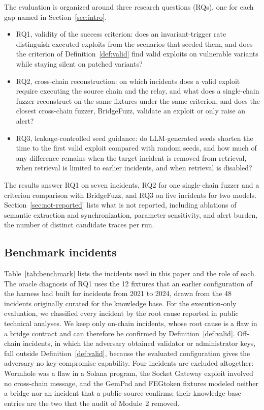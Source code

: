 \documentclass[a4paper]{cas-sc}
\begin{document}
The evaluation is organized around three research questions (RQs), one for each gap named in Section~\ref{sec:intro}.
\begin{itemize}
    \item RQ1, validity of the success criterion: does an invariant-trigger rate distinguish executed exploits from the scenarios that seeded them, and does the criterion of Definition~\ref{def:valid} find valid exploits on vulnerable variants while staying silent on patched variants?
    \item RQ2, cross-chain reconstruction: on which incidents does a valid exploit require executing the source chain and the relay, and what does a single-chain fuzzer reconstruct on the same fixtures under the same criterion, and does the closest cross-chain fuzzer, BridgeFuzz, validate an exploit or only raise an alert?
    \item RQ3, leakage-controlled seed guidance: do LLM-generated seeds shorten the time to the first valid exploit compared with random seeds, and how much of any difference remains when the target incident is removed from retrieval, when retrieval is limited to earlier incidents, and when retrieval is disabled?
\end{itemize}
The results answer RQ1 on seven incidents, RQ2 for one single-chain fuzzer and a criterion comparison with BridgeFuzz, and RQ3 on five incidents for two models. Section~\ref{sec:not-reported} lists what is not reported, including ablations of semantic extraction and synchronization, parameter sensitivity, and alert burden, the number of distinct candidate traces per run.

\subsection{Benchmark incidents}

Table~\ref{tab:benchmark} lists the incidents used in this paper and the role of each. The oracle diagnosis of RQ1 uses the 12 fixtures that an earlier configuration of the harness had built for incidents from 2021 to 2024, drawn from the 48 incidents originally curated for the knowledge base. For the execution-only evaluation, we classified every incident by the root cause reported in public technical analyses. We keep only on-chain incidents, whose root cause is a flaw in a bridge contract and can therefore be confirmed by Definition~\ref{def:valid}. Off-chain incidents, in which the adversary obtained validator or administrator keys, fall outside Definition~\ref{def:valid}, because the evaluated configuration gives the adversary no key-compromise capability. Four incidents are excluded altogether: Wormhole was a flaw in a Solana program, the Socket Gateway exploit involved no cross-chain message, and the GemPad and FEGtoken fixtures modeled neither a bridge nor an incident that a public source confirms; their knowledge-base entries are the two that the audit of Module~2 removed.
\end{document}
